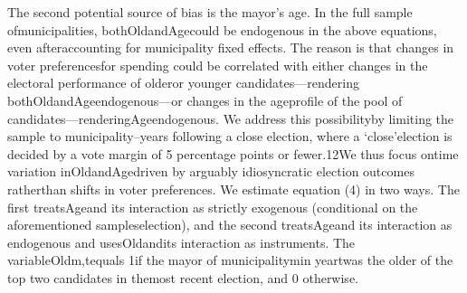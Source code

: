 The second potential source of bias is the mayor’s age. In the full sample ofmunicipalities, bothOldandAgecould be endogenous in the above equations, even afteraccounting for municipality fixed effects. The reason is that changes in voter preferencesfor spending could be correlated with either changes in the electoral performance of olderor younger candidates—rendering bothOldandAgeendogenous—or changes in the ageprofile of the pool of candidates—renderingAgeendogenous. We address this possibilityby limiting the sample to municipality–years following a close election, where a ‘close’election is decided by a vote margin of 5 percentage points or fewer.12We thus focus ontime variation inOldandAgedriven by arguably idiosyncratic election outcomes ratherthan shifts in voter preferences. We estimate equation (4) in two ways. The first treatsAgeand its interaction as strictly exogenous (conditional on the aforementioned sampleselection), and the second treatsAgeand its interaction as endogenous and usesOldandits interaction as instruments. The variableOldm,tequals 1if the mayor of municipalitymin yeartwas the older of the top two candidates in themost recent election, and 0 otherwise. 

